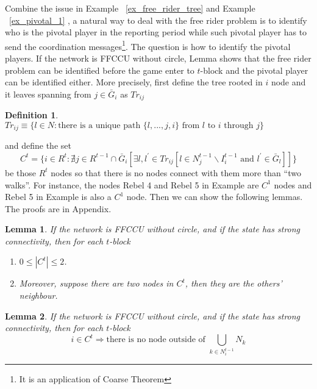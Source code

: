 \documentclass[12pt,letter]{article}
\newtheorem{lemma}{Lemma}[section]
\newtheorem{definition}{Definition}[section]
\theoremstyle{definition}
\theoremstyle{remark}
\theoremstyle{claim}
\begin{document}
Combine the issue in Example ~\ref{ex_free_rider_tree} and Example ~\ref{ex_pivotal_1} , a natural way to deal with the free rider problem is to identify who is the pivotal player in the reporting period while such pivotal player has to send the coordination messages\footnote{It is an application of Coarse Theorem}. The question is how to identify the pivotal players. If the network is FFCCU without circle, Lemma shows that the free rider problem can be identified before the game enter to $t$-block and the pivotal player can be identified either. More precisely, first define the tree rooted in $i$ node and it leaves spanning from $j\in \bar{G}_i$ as $Tr_{ij}$

\begin{definition}
$Tr_{ij}\equiv \{l\in N:\text{there is a unique path $\{l,...,j,i\}$ from $l$ to $i$ through $j$}\}$
\end{definition}
and define the set
\[C^t=\{i\in R^t:\nexists j\in R^{t-1}\cap \bar{G}_i[\exists l,l^{'}\in Tr_{ij}[l\in N^{t-1}_j\backslash I^{t-1}_i \text{ and } l^{'}\in \bar{G}_l]]\}\]
be those $R^t$ nodes so that there is no nodes connect with them more than ``two walks''. For instance, the nodes Rebel 4 and Rebel 5 in Example are $C^1$ nodes and Rebel 5 in Example is also a $C^1$ node. Then we can show the following lemmas. The proofs are in Appendix.

\begin{lemma}
\label{lemma_at_most_two_nodes}
If the network is FFCCU without circle, and  if the state has strong connectivity, then for each $t$-block
\begin{enumerate}
\item $0\leq |C^t| \leq 2$.
\item Moreover, suppose there are two nodes in $C^t$, then they are the others' neighbour.
\end{enumerate}
\end{lemma}


\begin{lemma}
\label{lemma_no_node_outside}
If the network is FFCCU without circle, and if the state has strong connectivity, then for each $t$-block
\[i\in C^t \Rightarrow \text{there is no node outside of }\bigcup_{k\in N^{t-1}_i}N_k\]
\end{lemma}
\end{document}
